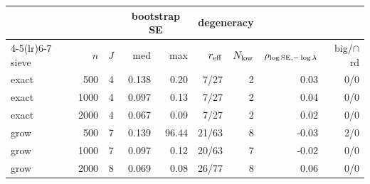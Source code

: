 \begin{table}[t]
\label{tab:sievedist}\begin{tabular}{l r r r r r r r r}\toprule
&&&\multicolumn{2}{c}{bootstrap SE}&\multicolumn{2}{c}{degeneracy}&&\\
\cmidrule(lr){4-5}\cmidrule(lr){6-7}
sieve&$n$&$J$&med&max&$r_{\rm eff}$&$N_{\rm low}$&$\rho_{\log{\rm SE},-\log\lambda}$&big/$\cap$rd\\\midrule
exact & 500 & 4 & 0.138 & 0.20 & 7/27 & 2 & 0.03 & 0/0 \\
exact & 1000 & 4 & 0.097 & 0.13 & 7/27 & 2 & 0.04 & 0/0 \\
exact & 2000 & 4 & 0.067 & 0.09 & 7/27 & 2 & 0.02 & 0/0 \\
\addlinespace
grow & 500 & 7 & 0.139 & 96.44 & 21/63 & 8 & -0.03 & 2/0 \\
grow & 1000 & 7 & 0.097 & 0.12 & 20/63 & 7 & -0.02 & 0/0 \\
grow & 2000 & 8 & 0.069 & 0.08 & 26/77 & 8 & 0.06 & 0/0 \\
\bottomrule\end{tabular}\end{table}
